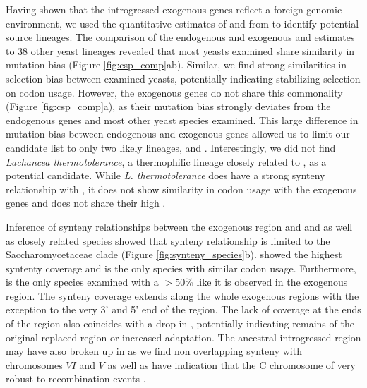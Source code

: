 \documentclass[12pt]{article}
\begin{document}
Having shown that the introgressed exogenous genes reflect a foreign genomic environment, we used the quantitative estimates of \DM and \DE from \ROC to identify potential source lineages.
The comparison of the endogenous and exogenous \DM and \DE estimates to 38 other yeast lineages revealed that most yeasts examined share similarity in mutation bias (Figure \ref{fig:csp_comp}ab).
Similar, we find strong similarities in selection bias between examined yeasts, potentially indicating stabilizing selection on codon usage.
However, the exogenous genes do not share this commonality (Figure \ref{fig:csp_comp}a), as their mutation bias strongly deviates from the endogenous genes and most other yeast species examined. 
This large difference in mutation bias between endogenous and exogenous genes allowed us to limit our candidate list to only two likely lineages, \dubl and \gossypii.
Interestingly, we did not find \textit{Lachancea thermotolerance}, a thermophilic lineage closely related to \kluyveri, as a potential candidate.
While \textit{L. thermotolerance} does have a strong synteny relationship with \kluyveri, it does not show similarity in codon usage with the exogenous genes and does not share their high \GC.

Inference of synteny relationships between the exogenous region and \dubl and \gossypii as well as closely related species showed that synteny relationship is limited to the Saccharomycetaceae clade (Figure \ref{fig:synteny_species}b).
\gossypii showed the highest syntenty coverage and is the only species with similar codon usage.
Furthermore, \gossypii is the only species examined with a \GC $> 50 \%$ like it is observed in the exogenous region.
The synteny coverage extends along the whole exogenous regions with the exception to the very 3' and 5' end of the region. 
The lack of coverage at the ends of the region also coincides with a drop in \GC, potentially indicating remains of the original replaced region or increased adaptation.
The ancestral introgressed region may have also broken up in \gossypii as we find non overlapping synteny with chromosomes $VI$ and $V$ as well as have indication that the C chromosome of \kluyveri very robust to recombination events \citep{payen2009, vakirlis2016}. 
\end{document}
